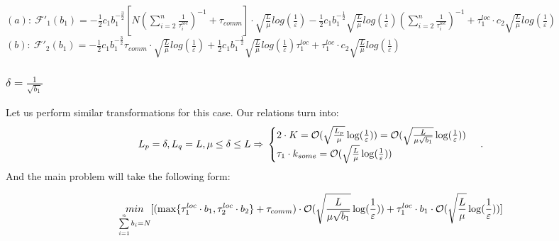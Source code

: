 \documentclass{article}
\begin{document}
$(a): ~\mathcal{F'}_1(b_1) = -\frac{1}{2}c_1 b_1^{-\frac{3}{2}}  [N (\sum\limits_{i = 2}^{n} \frac{1}{\tau_i^{loc}})^{-1} + \tau_{comm}]\cdot 
\sqrt{\frac{L}{\mu}}log (\frac{1}{\varepsilon})  - 
\frac{1}{2} c_1 b_1^{-\frac{1}{2}}   \sqrt{\frac{L}{\mu}}log (\frac{1}{\varepsilon})(\sum\limits_{i = 2}^{n} \frac{1}{\tau_i^{loc}})^{-1} +
\tau_1^{loc}\cdot c_2  \sqrt{\frac{L}{\mu}}log (\frac{1}{\varepsilon})$ \\
$(b): ~\mathcal{F'}_2(b_1) = -\frac{1}{2}c_1 b_1^{-\frac{3}{2}} \tau_{comm}\cdot \sqrt{\frac{L}{\mu}}log (\frac{1}{\varepsilon}) + \frac{1}{2} c_1 b_1^{-\frac{1}{2}}  \sqrt{\frac{L}{\mu}}log (\frac{1}{\varepsilon})\tau_1^{loc}   + \tau_1^{loc}\cdot c_2  \sqrt{\frac{L}{\mu}}log (\frac{1}{\varepsilon})$\\


\subsubsection{$\delta = \frac{1}{\sqrt{b_1}}$}
Let us perform similar transformations for this case. Our relations turn into:
\begin{equation}
    \notag
    L_p = \delta, L_q = L, \mu \leq \delta \leq L \Rightarrow 
    \\
    \notag
    \begin{cases}
      2\cdot K = \mathcal O(\sqrt{\frac{L_p}{\mu}}\log(\frac{1}{\varepsilon}))  = \mathcal O(\sqrt{\frac{L}{\mu \sqrt{b_1}}}\log(\frac{1}{\varepsilon}))\\
      \tau_1\cdot k_{some} = \mathcal O(\sqrt{\frac{L}{\mu}}\log(\frac{1}{\varepsilon}))
    \end{cases}\,.
\end{equation}
And the main problem will take the following form:

\begin{equation}
    \notag
    \underset{\sum\limits_{i = 1}^{n} b_i = N}{min}[(\max\{\tau_1^{loc}\cdot b_1, \tau_2^{loc}\cdot b_2\} + \tau_{comm}) \cdot \mathcal O(\sqrt{\frac{L}{\mu \sqrt{b_1}}}\log(\frac{1}{\varepsilon})) + \tau_1^{loc}\cdot b_1 \cdot \mathcal O(\sqrt{\frac{L}{\mu}}\log(\frac{1}{\varepsilon}))]
\end{equation}
\end{document}
